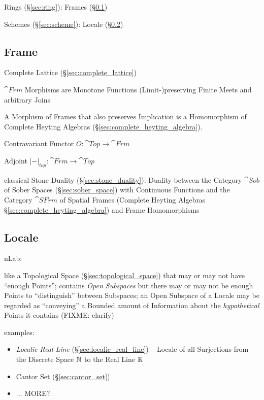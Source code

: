 Rings (\S\ref{sec:ring}): Frames (\S\ref{sec:frame})

Schemes (\S\ref{sec:scheme}): Locale (\S\ref{sec:locale})



\subsection{Frame}\label{sec:frame}

Complete Lattice (\S\ref{sec:complete_lattice})

$\cat{Frm}$ Morphisms are Monotone Functions (Limit-)preserving Finite
Meets and arbitrary Joins

A Morphism of Frames that also preserves Implication is a Homomorphism
of Complete Heyting Algebras (\S\ref{sec:complete_heyting_algebra}).

Contravariant Functor $O : \cat{Top} \rightarrow \cat{Frm}$

Adjoint $|-|_{top} : \cat{Frm} \rightarrow \cat{Top}$ %

classical Stone Duality (\S\ref{sec:stone_duality}): Duality between the
Category $\cat{Sob}$ of Sober Spaces (\S\ref{sec:sober_space}) with Continuous
Functions and the Category $\cat{SFrm}$ of Spatial Frames (Complete Heyting
Algebras \S\ref{sec:complete_heyting_algebra}) and Frame Homomorphisms



\subsection{Locale}\label{sec:locale}

nLab:

like a Topological Space (\S\ref{sec:topological_space}) that may or may not
have ``enough Points''; contains \emph{Open Subspaces} but there may or may not
be enough Points to ``distinguish'' between Subspaces; an Open Subspace of a
Locale may be regarded as ``conveying'' a Bounded amount of Information about
the \emph{hypothetical} Points it contains (FIXME: clarify)

examples:
\begin{itemize}
  \item \emph{Localic Real Line} (\S\ref{sec:localic_real_line}) -- Locale of
    all Surjections from the Discrete Space $\mathbb{N}$ to the Real Line $\mathbb{R}$
  \item Cantor Set (\S\ref{sec:cantor_set})
  \item ... MORE?
\end{itemize}

